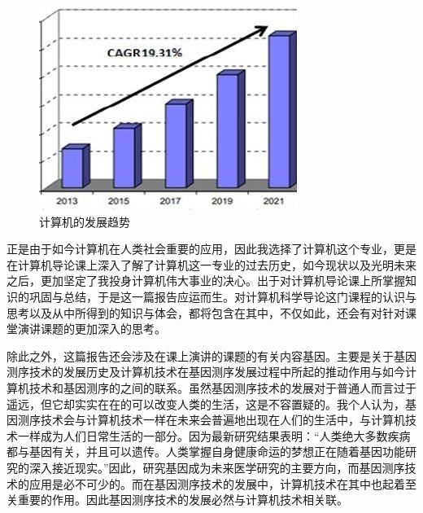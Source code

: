 \documentclass{article}
\begin{document}
\begin{figure}[h!]
	\centering
	\includegraphics[scale=0.9]{jisuanjifazhanqushi}
	\caption{计算机的发展趋势}
	\label{fig:jisuanjifazhanqushi}
\end{figure}
正是由于如今计算机在人类社会重要的应用，因此我选择了计算机这个专业，更是在计算机导论课上深入了解了计算机这一专业的过去历史，如今现状以及光明未来之后，更加坚定了我投身计算机伟大事业的决心。出于对计算机导论课上所掌握知识的巩固与总结，于是这一篇报告应运而生。对计算机科学导论这门课程的认识与思考以及从中所得到的知识与体会，都将包含在其中，不仅如此，还会有对针对课堂演讲课题的更加深入的思考。\par
除此之外，这篇报告还会涉及在课上演讲的课题的有关内容基因。主要是关于基因测序技术的发展历史及计算机技术在基因测序发展过程中所起的推动作用与如今计算机技术和基因测序的之间的联系。虽然基因测序技术的发展对于普通人而言过于遥远，但它却实实在在的可以改变人类的生活，这是不容置疑的。我个人认为，基因测序技术会与计算机技术一样在未来会普遍地出现在人们的生活中，与计算机技术一样成为人们日常生活的一部分。因为最新研究结果表明：“人类绝大多数疾病都与基因有关，并且可以遗传。人类掌握自身健康命运的梦想正在随着基因功能研究的深入接近现实。”因此，研究基因成为未来医学研究的主要方向，而基因测序技术的应用是必不可少的。而在基因测序技术的发展中，计算机技术在其中也起着至关重要的作用。因此基因测序技术的发展必然与计算机技术相关联。\par
\end{document}
